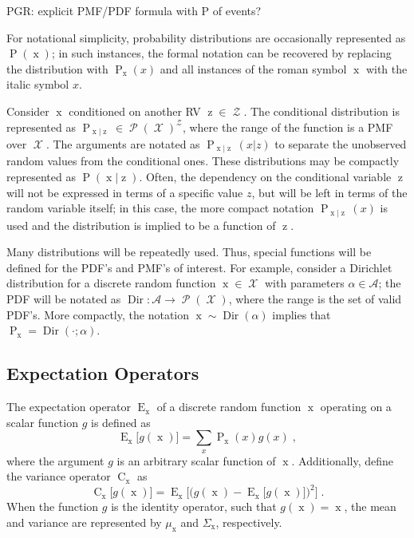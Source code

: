 \documentclass[12pt]{report}
\DeclareMathOperator{\xrm}{\mathrm{x}}
\DeclareMathOperator{\zrm}{\mathrm{z}}
\DeclareMathOperator{\Prm}{\mathrm{P}}
\DeclareMathOperator{\Erm}{\mathrm{E}}
\DeclareMathOperator{\Crm}{\mathrm{C}}
\DeclareMathOperator{\Xcal}{\mathcal{X}}
\DeclareMathOperator{\Zcal}{\mathcal{Z}}
\DeclareMathOperator{\Pcal}{\mathcal{P}}
\DeclareMathOperator{\Dir}{\mathrm{Dir}}
\begin{document}
PGR: explicit PMF/PDF formula with P of events?

For notational simplicity, probability distributions are occasionally represented as $\Prm(\xrm)$; in such instances, the formal notation can be recovered by replacing the distribution with $\Prm_{\xrm}(x)$ and all instances of the roman symbol $\xrm$ with the italic symbol $x$. 

Consider $\xrm$ conditioned on another RV $\zrm \in \Zcal$. The conditional distribution is represented as $\Prm_{\xrm | \zrm} \in \Pcal(\Xcal)^{\Zcal}$, where the range of the function is a PMF over $\Xcal$. The arguments are notated as $\Prm_{\xrm | \zrm}(x|z)$ to separate the unobserved random values from the conditional ones. These distributions may be compactly represented as $\Prm(\xrm|\zrm)$. Often, the dependency on the conditional variable $\zrm$ will not be expressed in terms of a specific value $z$, but will be left in terms of the random variable itself; in this case, the more compact notation $\Prm_{\xrm | \zrm}(x)$ is used and the distribution is implied to be a function of $\zrm$.

Many distributions will be repeatedly used. Thus, special functions will be defined for the PDF's and PMF's of interest. For example, consider a Dirichlet distribution for a discrete random function $\xrm \in \Xcal$ with parameters $\alpha \in \mathcal{A}$; the PDF will be notated as $\Dir : \mathcal{A} \to \Pcal(\Xcal)$, where the range is the set of valid PDF's. More compactly, the notation $\xrm \sim \Dir(\alpha)$ implies that $\Prm_{\xrm} = \Dir(\cdot ; \alpha)$.




\subsection*{Expectation Operators}

The expectation operator $\Erm_{\xrm}$ of a discrete random function $\xrm$ operating on a scalar function $g$ is defined as
\begin{equation}
\Erm_{\xrm}\big[ g(\xrm) \big] = \sum_{x} \Prm_{\xrm}(x) g(x) \;,
\end{equation}
where the argument $g$ is an arbitrary scalar function of $\xrm$. Additionally, define the variance operator $\Crm_{\xrm}$ as
\begin{equation}
\Crm_{\xrm}\big[g(\xrm)\big] = \Erm_{\xrm} \bigg[ \Big( g(\xrm) - \Erm_{\xrm}\big[g(\xrm)\big] \Big)^2 \bigg] \;.
\end{equation}
When the function $g$ is the identity operator, such that $g(\xrm) = \xrm$, the mean and variance are represented by $\mu_{\xrm}$ and $\Sigma_{\xrm}$, respectively.
\end{document}
